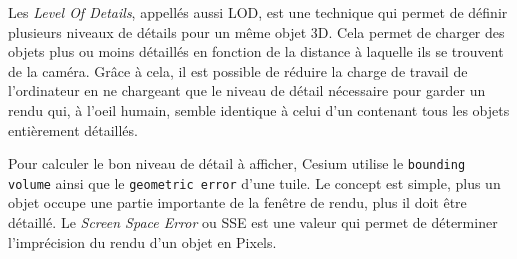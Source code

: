 Les \textit{Level Of Details}, appellés aussi LOD, est une technique qui permet de définir plusieurs niveaux de détails pour un même objet 3D. Cela permet de charger des objets plus ou moins détaillés en fonction de la distance à laquelle ils se trouvent de la caméra. Grâce à cela, il est possible de réduire la charge de travail de l'ordinateur en ne chargeant que le niveau de détail nécessaire pour garder un rendu qui, à l'oeil humain, semble identique à celui d'un contenant tous les objets entièrement détaillés.

Pour calculer le bon niveau de détail à afficher, Cesium utilise le \texttt{bounding volume} ainsi que le \texttt{geometric error} d'une tuile. Le concept est simple, plus un objet occupe une partie importante de la fenêtre de rendu, plus il doit être détaillé. Le \textit{Screen Space Error} ou SSE est une valeur qui permet de déterminer l'imprécision du rendu d'un objet en Pixels.